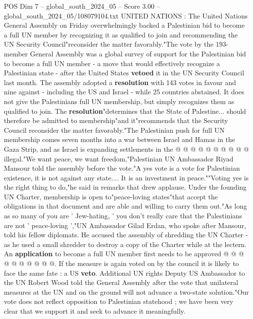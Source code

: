 \begin{textsample}{POS Dim 7 – global\_south\_2024\_05 – Score 3.00 – global\_south\_2024\_05/108079104.txt}  \label{ex:f7_pos_067}
UNITED NATIONS : The United Nations General Assembly on Friday overwhelmingly backed a Palestinian bid to become a full UN member by recognizing it as qualified to join and recommending the UN Security Council"reconsider the matter favorably."The vote by the 193-member General Assembly was a global survey of support for the Palestinian bid to become a full UN member - a move that would effectively recognize a Palestinian state - after the United States \textbf{vetoed} it in the UN Security Council last month.
The assembly adopted a \textbf{resolution} with 143 votes in favour and nine against - including the US and Israel - while 25 countries abstained.
It does not give the Palestinians full UN membership, but simply recognizes them as qualified to join.
The \textbf{resolution}"determines that the State of Palestine... should therefore be admitted to membership"and it"recommends that the Security Council reconsider the matter favorably."The Palestinian push for full UN membership comes seven months into a war between Israel and Hamas in the Gaza Strip, and as Israel is expanding settlements in the @ @ @ @ @ @ @ @ @ @ illegal."We want peace, we want freedom,"Palestinian UN Ambassador Riyad Mansour told the assembly before the vote."A yes vote is a vote for Palestinian existence, it is not against any state....
It is an investment in peace.""Voting yes is the right thing to do,"he said in remarks that drew applause.
Under the founding UN Charter, membership is open to"peace-loving states"that accept the obligations in that document and are able and willing to carry them out."As long as so many of you are ' Jew-hating, ' you don't really care that the Palestinians are not ' peace-loving ',"UN Ambassador Gilad Erdan, who spoke after Mansour, told his fellow diplomats.
He accused the assembly of shredding the UN Charter - as he used a small shredder to destroy a copy of the Charter while at the lectern.
An \textbf{application} to become a full UN member first needs to be approved @ @ @ @ @ @ @ @ @ @.
If the measure is again voted on by the council it is likely to face the same fate : a US \textbf{veto}.
Additional UN rights Deputy US Ambassador to the UN Robert Wood told the General Assembly after the vote that unilateral measures at the UN and on the ground will not advance a two-state solution."Our vote does not reflect opposition to Palestinian statehood ; we have been very clear that we support it and seek to advance it meaningfully.

\end{textsample}
